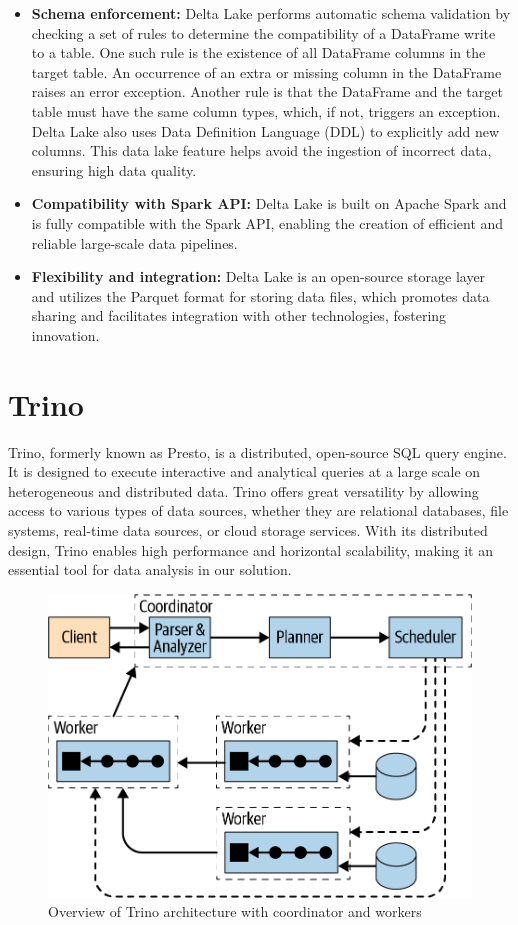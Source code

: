 \begin{itemize}
\item[\textbullet] \textbf{Schema enforcement:} Delta Lake performs automatic schema validation by checking a set of rules to determine the compatibility of a DataFrame write to a table. One such rule is the existence of all DataFrame columns in the target table. An occurrence of an extra or missing column in the DataFrame raises an error exception. Another rule is that the DataFrame and the target table must have the same column types, which, if not, triggers an exception. Delta Lake also uses Data Definition Language (DDL) to explicitly add new columns. This data lake feature helps avoid the ingestion of incorrect data, ensuring high data quality.
\item[\textbullet] \textbf{Compatibility with Spark API:} Delta Lake is built on Apache Spark and is fully compatible with the Spark API, enabling the creation of efficient and reliable large-scale data pipelines.
\item[\textbullet] \textbf{Flexibility and integration:} Delta Lake is an open-source storage layer and utilizes the Parquet format for storing data files, which promotes data sharing and facilitates integration with other technologies, fostering innovation.
\end{itemize}

\section{Trino}

Trino, formerly known as Presto, is a distributed, open-source SQL query engine. It is designed to execute interactive and analytical queries at a large scale on heterogeneous and distributed data. Trino offers great versatility by allowing access to various types of data sources, whether they are relational databases, file systems, real-time data sources, or cloud storage services. With its distributed design, Trino enables high performance and horizontal scalability, making it an essential tool for data analysis in our solution.

\begin{figure}[H]
\centering
\includegraphics[width=0.8\linewidth]{images/trino_architecture.png}
\caption{Overview of Trino architecture with coordinator and workers}\label{fig:trino-architecture}
\end{figure}

